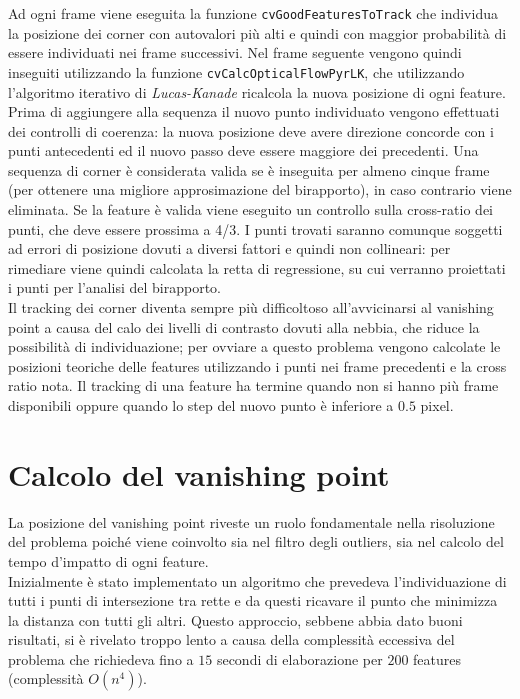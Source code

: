 \documentclass[12pt]{report}
\begin{document}
\noindent Ad ogni frame viene eseguita la funzione \verb|cvGoodFeaturesToTrack| che individua la posizione dei corner con autovalori pi\`u alti e quindi con maggior probabilit\`a di essere individuati nei frame successivi. Nel frame seguente vengono quindi inseguiti utilizzando la funzione \verb|cvCalcOpticalFlowPyrLK|, che utilizzando l'algoritmo iterativo di \emph{Lucas-Kanade} ricalcola la nuova posizione di ogni feature.\\

\noindent Prima di aggiungere alla sequenza il nuovo punto individuato vengono effettuati dei controlli di coerenza: la nuova posizione deve avere direzione concorde con i punti antecedenti ed il nuovo passo deve essere maggiore dei precedenti. Una sequenza di corner \`e considerata valida se \`e inseguita per almeno cinque frame (per ottenere una migliore approsimazione del birapporto), in caso contrario viene eliminata. Se la feature \`e valida viene eseguito un controllo sulla cross-ratio dei punti, che deve essere prossima a 4/3. I punti trovati saranno comunque soggetti ad errori di posizione dovuti a diversi fattori e quindi non collineari: per rimediare viene quindi calcolata la retta di regressione, su cui verranno proiettati i punti per l'analisi del birapporto.\\

\noindent Il tracking dei corner diventa sempre pi\`u difficoltoso all'avvicinarsi al vanishing point a causa del calo dei livelli di contrasto dovuti alla nebbia, che riduce la possibilit\`a di individuazione; per ovviare a questo problema vengono calcolate le posizioni teoriche delle features utilizzando i punti nei frame precedenti e la cross ratio nota. Il tracking di una feature ha termine quando non si hanno pi\`u frame disponibili oppure quando lo step del nuovo punto \`e inferiore a $0.5$ pixel.

\section{Calcolo del vanishing point}
\label{sect:vp}
La posizione del vanishing point riveste un ruolo fondamentale nella risoluzione del problema poich\'e viene coinvolto sia nel filtro degli outliers, sia nel calcolo del tempo d'impatto di ogni feature.\\

\noindent Inizialmente \`e stato implementato un algoritmo che prevedeva l'individuazione di tutti i punti di intersezione tra rette e da questi ricavare il punto che minimizza la distanza con tutti gli altri. Questo approccio, sebbene abbia dato buoni risultati, si \`e rivelato troppo lento a causa della complessit\`a eccessiva del problema che richiedeva fino a $15$ secondi di elaborazione per $200$ features (complessit\`a $O\left(n^4\right)$).\\
\end{document}
